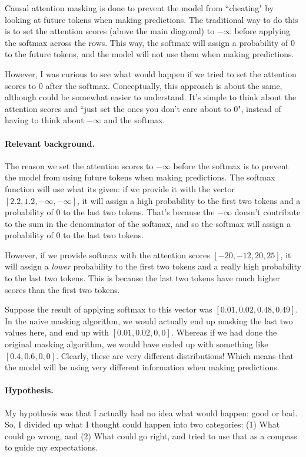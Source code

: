 \documentclass{article}
\begin{document}
Causal attention masking is done to prevent the model from ``cheating" by
looking at future tokens when making predictions. The traditional way to do this
is to set the attention scores (above the main diagonal) to $-\infty$ before
applying the softmax across the rows. This way, the softmax will assign a
probability of 0 to the future tokens, and the model will not use them when
making predictions.

However, I was curious to see what would happen if we tried to set the attention
scores to 0 after the softmax. Conceptually, this approach is about the same,
although could be somewhat easier to understand. It's simple to think about the
attention scores and ``just set the ones you don't care about to 0", instead of
having to think about $-\infty$ and the softmax.

\paragraph{Relevant background.} The reason we set the attention scores to
$-\infty$ before the softmax is to prevent the model from using future tokens
when making predictions. The softmax function will use what its given: if we
provide it with the vector $[2.2, 1.2, -\infty, -\infty]$, it will assign a high
probability to the first two tokens and a probability of 0 to the last two
tokens. That's because the $-\infty$ doesn't contribute to the sum in the
denominator of the softmax, and so the softmax will assign a probability of 0 to
the last two tokens.

However, if we provide softmax with the attention scores $[-20, -12, 20, 25]$,
it will assign a \textit{lower} probability to the first two tokens and a really
high probability to the last two tokens. This is because the last two tokens
have much higher scores than the first two tokens.

Suppose the result of applying softmax to this vector was $[0.01, 0.02, 0.48,
0.49]$. In the naive masking algorithm, we would actually end up masking the
last two values here, and end up with $[0.01, 0.02, 0, 0]$. Whereas if we had
done the original masking algorithm, we would have ended up with something like
$[0.4, 0.6, 0, 0]$. Clearly, these are very different distributions! Which means
that the model will be using very different information when making predictions.

\paragraph{Hypothesis.} My hypothesis was that I actually had no idea what would
happen: good or bad. So, I divided up what I thought could happen into two
categories: (1) What could go wrong, and (2) What could go right, and tried to
use that as a compass to guide my expectations.
\end{document}
